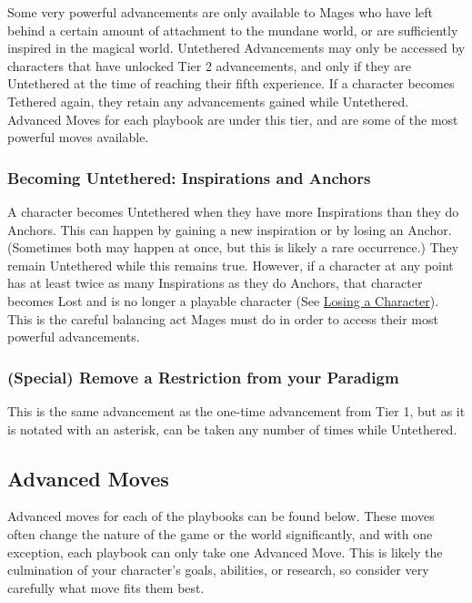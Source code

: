 \documentclass[
]{memoir}
\begin{document}
Some very powerful advancements are only available to Mages who have
left behind a certain amount of attachment to the mundane world, or are
sufficiently inspired in the magical world. Untethered Advancements may
only be accessed by characters that have unlocked Tier 2 advancements,
and only if they are Untethered at the time of reaching their fifth
experience. If a character becomes Tethered again, they retain any
advancements gained while Untethered. Advanced Moves for each playbook
are under this tier, and are some of the most powerful moves available.

\hypertarget{becoming-untethered-inspirations-and-anchors}{%
\subsubsection{Becoming Untethered: Inspirations and
Anchors}\label{becoming-untethered-inspirations-and-anchors}}

A character becomes Untethered when they have more Inspirations than
they do Anchors. This can happen by gaining a new inspiration or by
losing an Anchor. (Sometimes both may happen at once, but this is likely
a rare occurrence.) They remain Untethered while this remains true.
However, if a character at any point has at least twice as many
Inspirations as they do Anchors, that character becomes Lost and is no
longer a playable character (See
\href{AnchorsandInspirationsLosingACharacter}{Losing a Character}). This
is the careful balancing act Mages must do in order to access their most
powerful advancements.

\hypertarget{special-remove-a-restriction-from-your-paradigm}{%
\subsubsection{(Special) Remove a Restriction from your
Paradigm}\label{special-remove-a-restriction-from-your-paradigm}}

This is the same advancement as the one-time advancement from Tier 1,
but as it is notated with an asterisk, can be taken any number of times
while Untethered.

\label{Advanced Moves}

\hypertarget{advanced-moves-1}{%
\subsection{Advanced Moves}\label{advanced-moves-1}}

Advanced moves for each of the playbooks can be found below. These moves
often change the nature of the game or the world significantly, and with
one exception, each playbook can only take one Advanced Move. This is
likely the culmination of your character's goals, abilities, or
research, so consider very carefully what move fits them best.
\end{document}
